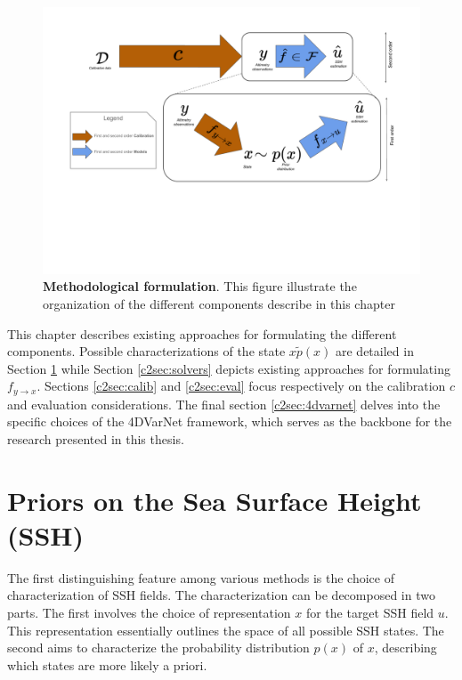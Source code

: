 \begin{bibunit}
\begin{figure}[h]
    \centering
    \includegraphics[width=\textwidth, clip,trim=0 5cm 0 0]{00_LitReview/Method-highlevel.pdf}
    \caption{\textbf{Methodological formulation}. This figure illustrate the organization of the different components describe in this chapter}
    \label{c2fig:methodhl}
\end{figure}

  This chapter describes existing approaches for formulating the different components. Possible characterizations of the state $x \tilde p(x)$ are detailed in Section \ref{c2sec:prior} while Section \ref{c2sec:solvers} depicts existing approaches for formulating $f_{y\to x}$. Sections \ref{c2sec:calib} and \ref{c2sec:eval} focus respectively on the calibration $c$ and evaluation considerations.
  The final section \ref{c2sec:4dvarnet} delves into the specific choices of the 4DVarNet framework, which serves as the backbone for the research presented in this thesis.





 \section{Priors on the Sea Surface Height (SSH)}
  \label{c2sec:prior}
The first distinguishing feature among various methods is the choice of characterization of SSH fields. The characterization can be decomposed in two parts.
The first involves the choice of representation $x$ for the target SSH field $u$. This representation essentially outlines the space of all possible SSH states.
The second aims to characterize the probability distribution $p(x)$ of $x$, describing which states are more likely a priori.




\end{bibunit}
